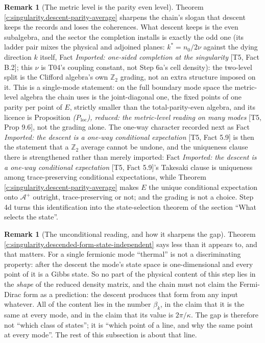 \documentclass[11pt]{article}
\theoremstyle{definition}
\newtheorem{remark}[theorem]{Remark}
\theoremstyle{plain}
\providecommand{\Aev}{}\renewcommand{\Aev}{\mathcal{A}^{+}}
\providecommand{\nO}{}\renewcommand{\nO}{n_0}
\begin{document}
\begin{remark}[The metric level is the parity even level]\label{c:note.singularity.metric-level-parity-even-level}
Theorem \ref{c:singularity.descent-parity-average} sharpens the chain's slogan that descent keeps the records and loses the coherences. What descent keeps is the even subalgebra, and the sector the completion installs is exactly the odd one (its ladder pair mixes the physical and adjoined planes: $k^{*} = \nO/2\nu$ against the dying direction $k$ itself, Fact \emph{Imported: one-sided completion at the singularity} [T5, Fact B.2]; this $\nu$ is T04's coupling constant, not Step 6a's cell density): the two-level split is the Clifford algebra's own $\mathbb{Z}_2$ grading, not an extra structure imposed on it. This is a single-mode statement: on the full boundary mode space the metric-level algebra the chain uses is the joint-diagonal one, the fixed points of one parity per point of $E$, strictly smaller than the total-parity-even algebra, and its licence is Proposition \emph{(P$_{\mathrm{loc}}$), reduced: the metric-level reading on many modes} [T5, Prop 9.6], not the grading alone. The one-way character recorded next as Fact \emph{Imported: the descent is a one-way conditional expectation} [T5, Fact 5.9] is then the statement that a $\mathbb{Z}_2$ average cannot be undone, and the uniqueness clause there is strengthened rather than merely imported: Fact \emph{Imported: the descent is a one-way conditional expectation} [T5, Fact 5.9]'s Takesaki clause is uniqueness among trace-preserving conditional expectations, while Theorem \ref{c:singularity.descent-parity-average} makes $E$ the unique conditional expectation onto $\Aev$ outright, trace-preserving or not; and the grading is not a choice. Step 4d turns this identification into the state-selection theorem of the section ``What selects the state''.
\end{remark}

\begin{remark}[The unconditional reading, and how it sharpens the gap]\label{c:note.singularity.unconditional-reading-how-it-sharpens-gap}
Theorem \ref{c:singularity.descended-form-state-independent} says less than it appears to, and that matters. For a single fermionic mode ``thermal'' is not a discriminating property: after the descent the mode's state space is one-dimensional and every point of it is a Gibbs state. So no part of the physical content of this step lies in the \emph{shape} of the reduced density matrix, and the chain must not claim the Fermi-Dirac form as a prediction: the descent produces that form from any input whatever. All of the content lies in the number $\beta_k$, in the claim that it is the same at every mode, and in the claim that its value is $2\pi/\kappa$. The gap is therefore not ``which class of states''; it is ``which point of a line, and why the same point at every mode''. The rest of this subsection is about that line.
\end{remark}
\end{document}
